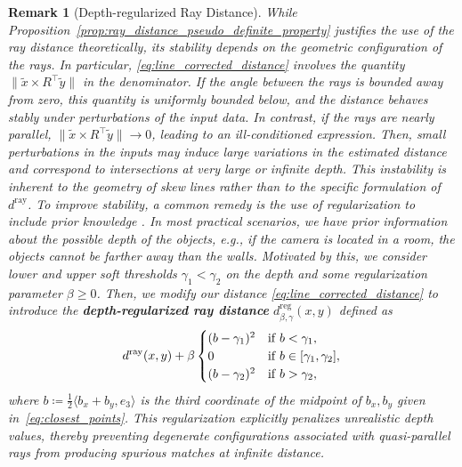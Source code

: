\documentclass[10pt, twocolumn]{article}
\newtheorem{remark}[theorem]{Remark}
\theoremstyle{definition}
\begin{document}
\begin{remark}[Depth-regularized Ray Distance]
{\color{black}
While Proposition~\ref{prop:ray_distance_pseudo_definite_property} justifies the use of the ray distance theoretically, its stability depends on the geometric configuration of the rays. In particular,  \eqref{eq:line_corrected_distance} involves the quantity $\|\tilde x \times R^\top \tilde y\|$ in the denominator. If the angle between the rays is bounded away from zero, this quantity is uniformly bounded below, and the distance behaves stably under perturbations of the input data.
In contrast, if the rays are nearly parallel, $\|\tilde x \times R^\top \tilde y\| \to 0$, leading to an ill-conditioned expression. Then, small perturbations in the inputs may induce large variations in the estimated distance and correspond to intersections at very large or infinite depth. This instability is inherent to the geometry of skew lines rather than to the specific formulation of $d^\mathrm{ray}$.
}
To improve stability,
a common remedy is the use of regularization to include prior knowledge
\cite{benning2018modern}.
In most practical scenarios, we have prior information about the possible depth of the objects, e.g., if the camera is located in a room, the objects cannot be farther away than the walls.
Motivated by this, we consider lower and upper soft thresholds $\gamma_1<\gamma_2$ on the depth and some regularization parameter $\beta\ge0$.
Then, we modify our distance \eqref{eq:line_corrected_distance} to introduce the \textbf{depth-regularized ray distance} $d^\mathrm{reg}_{\beta,\gamma}(x,y)$ defined as
\begin{equation} \label{eq:corrected_distance_line_z}
    d^\mathrm{ray}(x,y)
    +
    \beta
    \begin{cases}
        (b-\gamma_1)^2 & {\rm{ if }} \; b<\gamma_1,\\
        0 & {\rm{ if }} \; b\in[\gamma_1,\gamma_2],\\
        (b-\gamma_2)^2 & {\rm{ if }}  \; b>\gamma_2,\\
    \end{cases}
\end{equation}
where 
$b \coloneqq \frac12 \langle b_x + b_y, e_3\rangle$ is the third coordinate of the midpoint of $b_x,b_y$ given in~\eqref{eq:closest_points}. 
{\color{black}This regularization explicitly penalizes unrealistic depth values, thereby preventing degenerate configurations associated with quasi-parallel rays from producing spurious matches at infinite distance.}
\end{remark}
\end{document}
